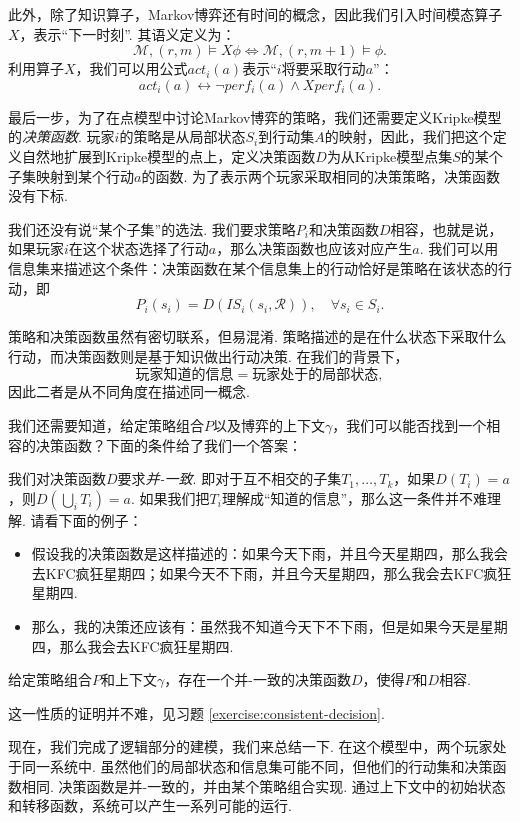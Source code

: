 此外，除了知识算子，Markov博弈还有时间的概念，因此我们引入时间模态算子$X$，表示“下一时刻”. 其语义定义为：
\[
\mathcal{M}, (r, m) \vDash X\phi \iff \mathcal{M}, (r, m+1) \vDash \phi.
\]
利用算子$X$，我们可以用公式$act_i(a)$表示“$i$将要采取行动$a$”：
\[act_i(a) \leftrightarrow \neg perf_i(a) \wedge X perf_i(a).\]

最后一步，为了在点模型中讨论Markov博弈的策略，我们还需要定义Kripke模型的\textit{决策函数}. 玩家$i$的策略是从局部状态$S_i$到行动集$A$的映射，因此，我们把这个定义自然地扩展到Kripke模型的点上，定义决策函数$D$为从Kripke模型点集$S$的某个子集映射到某个行动$a$的函数. 为了表示两个玩家采取相同的决策策略，决策函数没有下标. 

我们还没有说“某个子集”的选法. 我们要求策略$P_i$和决策函数$D$相容，也就是说，如果玩家$i$在这个状态选择了行动$a$，那么决策函数也应该对应产生$a$. 我们可以用信息集来描述这个条件：决策函数在某个信息集上的行动恰好是策略在该状态的行动，即
\[
P_i(s_i) = D(IS_i(s_i, \mathcal{R})), \quad \forall s_i \in S_i.
\]

策略和决策函数虽然有密切联系，但易混淆. 策略描述的是在什么状态下采取什么行动，而决策函数则是基于知识做出行动决策. 在我们的背景下，
    \[\text{玩家知道的信息}=\text{玩家处于的局部状态},\]
因此二者是从不同角度在描述同一概念. 

我们还需要知道，给定策略组合$P$以及博弈的上下文$\gamma$，我们可以能否找到一个相容的决策函数？下面的条件给了我们一个答案：

我们对决策函数$D$要求\textit{并-一致}. 即对于互不相交的子集$T_1, \dots, T_k$，如果$D(T_i) = a$，则$D(\bigcup_i T_i) = a$. 如果我们把$T_i$理解成“知道的信息”，那么这一条件并不难理解. 请看下面的例子：
\begin{itemize}
    \item 假设我的决策函数是这样描述的：如果今天下雨，并且今天星期四，那么我会去KFC疯狂星期四；如果今天不下雨，并且今天星期四，那么我会去KFC疯狂星期四.
    \item 那么，我的决策还应该有：虽然我不知道今天下不下雨，但是如果今天是星期四，那么我会去KFC疯狂星期四.
\end{itemize}

\begin{proposition}\label{prop:consistent-decision}
    给定策略组合$P$和上下文$\gamma$，存在一个并-一致的决策函数$D$，使得$P$和$D$相容. 
\end{proposition}

这一性质的证明并不难，见习题 \ref{exercise:consistent-decision}.

现在，我们完成了逻辑部分的建模，我们来总结一下. 在这个模型中，两个玩家处于同一系统中. 虽然他们的局部状态和信息集可能不同，但他们的行动集和决策函数相同. 决策函数是并-一致的，并由某个策略组合实现. 通过上下文中的初始状态和转移函数，系统可以产生一系列可能的运行. 

